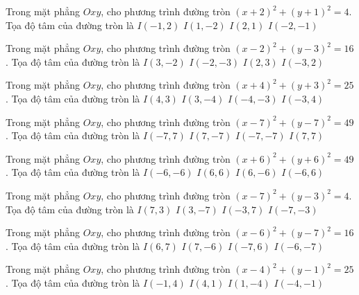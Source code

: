 \begin{ex}
Trong mặt phẳng $Oxy$, cho phương trình đường tròn $(x + 2)^2  + (y + 1)^2 = 4$. Tọa độ tâm của đường tròn là
\choice
{ $I(-1, 2)$ }
{ $I(1, -2)$ }
{ $I(2, 1)$ }
{ \True $I(-2, -1)$ }
\end{ex}

\begin{ex}
Trong mặt phẳng $Oxy$, cho phương trình đường tròn $(x -2)^2   + (y -3)^2 = 16$. Tọa độ tâm của đường tròn là
\choice
{ $I(3, -2)$ }
{ $I(-2, -3)$ }
{ \True $I(2, 3)$ }
{ $I(-3, 2)$ }
\end{ex}

\begin{ex}
Trong mặt phẳng $Oxy$, cho phương trình đường tròn $(x + 4)^2  + (y + 3)^2 = 25$. Tọa độ tâm của đường tròn là
\choice
{ $I(4, 3)$ }
{ $I(3, -4)$ }
{ \True $I(-4, -3)$ }
{ $I(-3, 4)$ }
\end{ex}

\begin{ex}
Trong mặt phẳng $Oxy$, cho phương trình đường tròn $(x -7)^2   + (y -7)^2 = 49$. Tọa độ tâm của đường tròn là
\choice
{ $I(-7, 7)$ }
{ $I(7, -7)$ }
{ $I(-7, -7)$ }
{ \True $I(7, 7)$ }
\end{ex}

\begin{ex}
Trong mặt phẳng $Oxy$, cho phương trình đường tròn $(x + 6)^2  + (y + 6)^2 = 49$. Tọa độ tâm của đường tròn là
\choice
{ \True $I(-6, -6)$ }
{ $I(6, 6)$ }
{ $I(6, -6)$ }
{ $I(-6, 6)$ }
\end{ex}

\begin{ex}
Trong mặt phẳng $Oxy$, cho phương trình đường tròn $(x -7)^2   + (y -3)^2 = 4$. Tọa độ tâm của đường tròn là
\choice
{ \True $I(7, 3)$ }
{ $I(3, -7)$ }
{ $I(-3, 7)$ }
{ $I(-7, -3)$ }
\end{ex}

\begin{ex}
Trong mặt phẳng $Oxy$, cho phương trình đường tròn $(x -6)^2   + (y -7)^2 = 16$. Tọa độ tâm của đường tròn là
\choice
{ \True $I(6, 7)$ }
{ $I(7, -6)$ }
{ $I(-7, 6)$ }
{ $I(-6, -7)$ }
\end{ex}

\begin{ex}
Trong mặt phẳng $Oxy$, cho phương trình đường tròn $(x -4)^2   + (y -1)^2 = 25$. Tọa độ tâm của đường tròn là
\choice
{ $I(-1, 4)$ }
{ \True $I(4, 1)$ }
{ $I(1, -4)$ }
{ $I(-4, -1)$ }
\end{ex}


